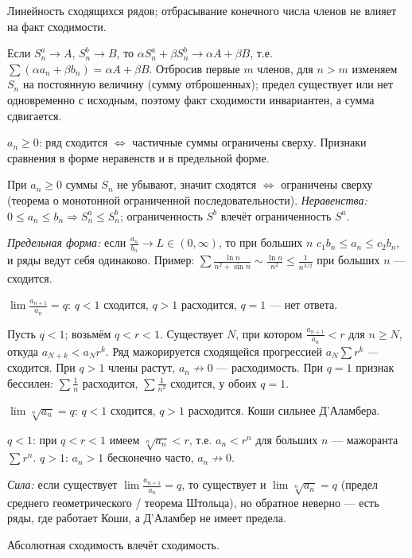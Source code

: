 \stmt Линейность сходящихся рядов; отбрасывание конечного числа членов не влияет на факт
сходимости.

\dok Если $S_n^a\to A$, $S_n^b\to B$, то $\alpha S_n^a+\beta S_n^b\to\alpha A+\beta B$, т.е.
$\sum(\alpha a_n+\beta b_n)=\alpha A+\beta B$. Отбросив первые $m$ членов, для $n>m$ изменяем $S_n$
на постоянную величину (сумму отброшенных); предел существует или нет одновременно с исходным,
поэтому факт сходимости инвариантен, а сумма сдвигается.

\stmt $a_n\ge0$: ряд сходится $\iff$ частичные суммы ограничены сверху. Признаки сравнения в форме
неравенств и в предельной форме.

\dok При $a_n\ge0$ суммы $S_n$ не убывают, значит сходятся $\iff$ ограничены сверху (теорема о
монотонной ограниченной последовательности). \emph{Неравенства:} $0\le a_n\le b_n\Rightarrow
S_n^a\le S_n^b$; ограниченность $S^b$ влечёт ограниченность $S^a$.

\emph{Предельная форма:} если
$\tfrac{a_n}{b_n}\to L\in(0,\infty)$, то при больших $n$ $c_1 b_n\le a_n\le c_2 b_n$, и ряды ведут
себя одинаково. Пример: $\sum\tfrac{\ln n}{n^2+\sin n}\sim\tfrac{\ln n}{n^2}\le\tfrac1{n^{3/2}}$ при
больших $n$ — сходится.

\stmt $\lim\tfrac{a_{n+1}}{a_n}=q$: $q<1$ сходится, $q>1$ расходится, $q=1$ — нет ответа.

\dok Пусть $q<1$; возьмём $q<r<1$. Существует $N$, при котором $\tfrac{a_{n+1}}{a_n}<r$ для $n\ge N$,
откуда $a_{N+k}<a_N r^k$. Ряд мажорируется сходящейся прогрессией $a_N\sum r^k$ — сходится. При
$q>1$ члены растут, $a_n\not\to0$ — расходимость. При $q=1$ признак бессилен: $\sum\tfrac1n$
расходится, $\sum\tfrac1{n^2}$ сходится, у обоих $q=1$.

\stmt $\lim\sqrt[n]{a_n}=q$: $q<1$ сходится, $q>1$ расходится. Коши сильнее Д'Аламбера.

\dok $q<1$: при $q<r<1$ имеем $\sqrt[n]{a_n}<r$, т.е. $a_n<r^n$ для больших $n$ — мажоранта
$\sum r^n$. $q>1$: $a_n>1$ бесконечно часто, $a_n\not\to0$.

\emph{Сила:} если существует
$\lim\tfrac{a_{n+1}}{a_n}=q$, то существует и $\lim\sqrt[n]{a_n}=q$ (предел среднего
геометрического / теорема Штольца), но обратное неверно — есть ряды, где работает Коши, а
Д'Аламбер не имеет предела.

\stmt Абсолютная сходимость влечёт сходимость.


